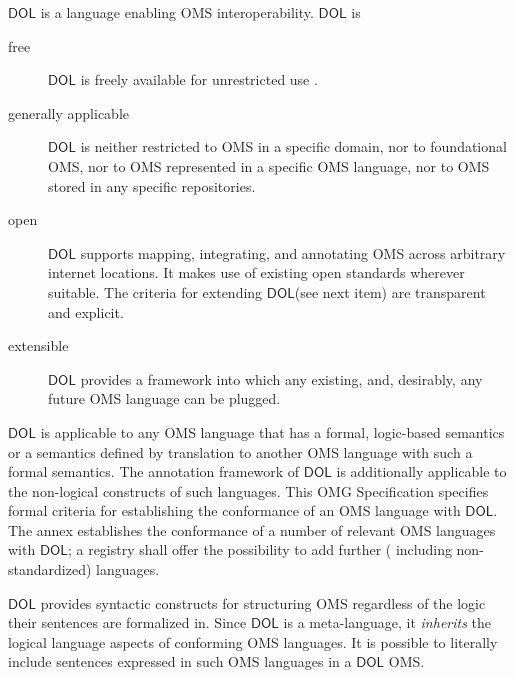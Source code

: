 \documentclass[10pt,fleqn,final]{scrreprt}
\newcommand*{\IS}{OMG Specification\xspace}
\newcommand*{\DOL}{\ensuremath{\mathsf{DOL}}\xspace}
\providecommand{\DIFadd}[1]{{\protect\color{blue}\uwave{#1}}} %
\providecommand{\DIFaddbegin}{} %
\providecommand{\DIFaddend}{} %
\begin{document}
\DOL is a language enabling OMS interoperability. 
\DOL is
\begin{description}
\item[free] \DOL is freely available for unrestricted use \DIFaddbegin \DIFadd{(as any OMG specification is)}\DIFaddend .
\item[generally applicable] \DOL is neither restricted to OMS in a specific domain, nor to foundational OMS, nor to OMS represented in a specific OMS language, nor to OMS stored in any specific repositories.
\item[open] \DOL supports mapping, integrating, and annotating OMS across arbitrary internet locations.  It makes use of existing open standards wherever suitable.  The criteria for extending \DOL (see next item) are transparent and explicit.
\item[extensible] \DOL provides a framework into which any existing, and, desirably, any future OMS language can be plugged.
\end{description}
\DOL is applicable to any OMS language that has a formal, logic-based semantics or a semantics defined by translation to another OMS language with such a formal semantics. The annotation framework of \DOL is additionally applicable to the non-logical constructs of such languages. This \IS specifies formal criteria for establishing the conformance of an OMS language with \DOL.  The annex establishes the conformance of a number of relevant OMS languages with \DOL; a registry shall offer the possibility to add further ( including non-standardized) languages. 

\DOL provides syntactic constructs for structuring OMS regardless of the logic their sentences are formalized in. 
Since \DOL is a meta-language,  it \textit{inherits} the logical language aspects of conforming OMS languages.  It is possible to literally include sentences expressed in such OMS languages in a \DOL OMS.
\end{document}
